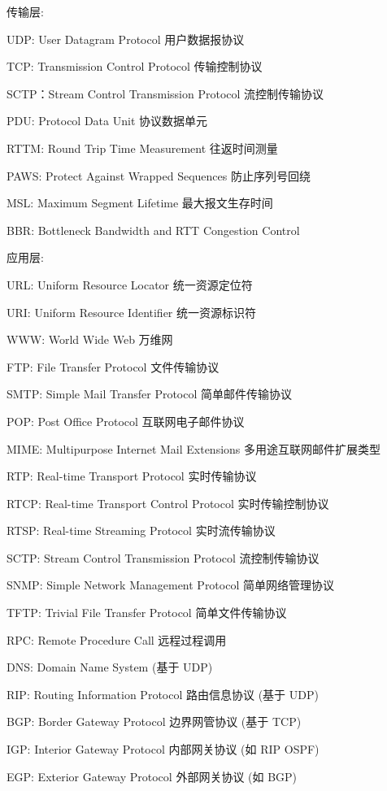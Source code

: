 \documentclass[UTF8,cs4size]{ctexart}
\begin{document}
传输层:
\begin{compactitem}
  \item UDP: User Datagram Protocol 用户数据报协议
  \item TCP: Transmission Control Protocol 传输控制协议
  \item SCTP：Stream Control Transmission Protocol 流控制传输协议
  \item PDU: Protocol Data Unit 协议数据单元
  \item RTTM: Round Trip Time Measurement 往返时间测量
  \item PAWS: Protect Against Wrapped Sequences 防止序列号回绕
  \item MSL: Maximum Segment Lifetime 最大报文生存时间 
  \item BBR: Bottleneck Bandwidth and RTT Congestion Control
\end{compactitem}

应用层:
\begin{compactitem}
  \item URL: Uniform Resource Locator 统一资源定位符
  \item URI: Uniform Resource Identifier 统一资源标识符
  \item WWW: World Wide Web 万维网
  \item FTP: File Transfer Protocol 文件传输协议
  \item SMTP: Simple Mail Transfer Protocol 简单邮件传输协议
  \item POP: Post Office Protocol 互联网电子邮件协议
  \item MIME: Multipurpose Internet Mail Extensions 多用途互联网邮件扩展类型
  \item RTP: Real-time Transport Protocol 实时传输协议
  \item RTCP: Real-time Transport Control Protocol 实时传输控制协议
  \item RTSP: Real-time Streaming Protocol 实时流传输协议
  \item SCTP: Stream Control Transmission Protocol 流控制传输协议
  \item SNMP: Simple Network Management Protocol 简单网络管理协议
  \item TFTP: Trivial File Transfer Protocol 简单文件传输协议
  \item RPC: Remote Procedure Call 远程过程调用
  \item DNS: Domain Name System (基于 UDP)
  \item RIP: Routing Information Protocol 路由信息协议 (基于 UDP)
  \item BGP: Border Gateway Protocol 边界网管协议 (基于 TCP)
  \item IGP: Interior Gateway Protocol 内部网关协议 (如 RIP OSPF)
  \item EGP: Exterior Gateway Protocol 外部网关协议 (如 BGP)
\end{compactitem}
\end{document}
